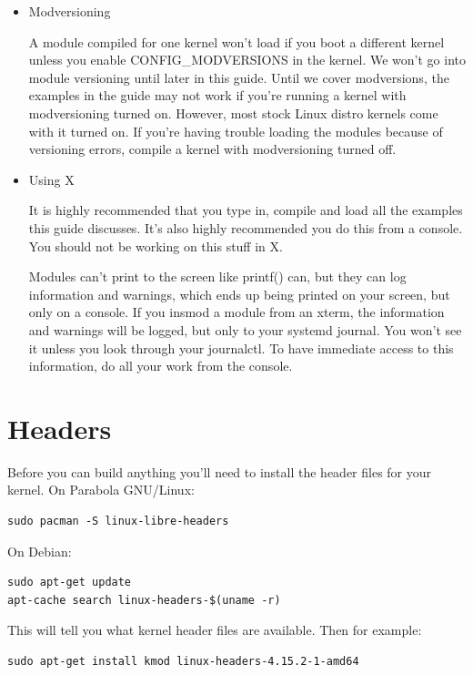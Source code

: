 \documentclass[11pt]{article}
\begin{document}
\begin{itemize}
\item Modversioning
\label{sec-1-8-0-1}

A module compiled for one kernel won't load if you boot a different kernel unless you enable CONFIG\_MODVERSIONS in the kernel. We won't go into module versioning until later in this guide. Until we cover modversions, the examples in the guide may not work if you're running a kernel with modversioning turned on. However, most stock Linux distro kernels come with it turned on. If you're having trouble loading the modules because of versioning errors, compile a kernel with modversioning turned off.

\item Using X
\label{sec-1-8-0-2}

It is highly recommended that you type in, compile and load all the examples this guide discusses. It's also highly recommended you do this from a console. You should not be working on this stuff in X.

Modules can't print to the screen like printf() can, but they can log information and warnings, which ends up being printed on your screen, but only on a console. If you insmod a module from an xterm, the information and warnings will be logged, but only to your systemd journal. You won't see it unless you look through your journalctl. To have immediate access to this information, do all your work from the console.
\end{itemize}

\section*{Headers}
\label{sec-2}
Before you can build anything you'll need to install the header files for your kernel. On Parabola GNU/Linux:

\begin{verbatim}
sudo pacman -S linux-libre-headers
\end{verbatim}

On Debian:

\begin{verbatim}
sudo apt-get update
apt-cache search linux-headers-$(uname -r)
\end{verbatim}

This will tell you what kernel header files are available. Then for example:

\begin{verbatim}
sudo apt-get install kmod linux-headers-4.15.2-1-amd64
\end{verbatim}
\end{document}
